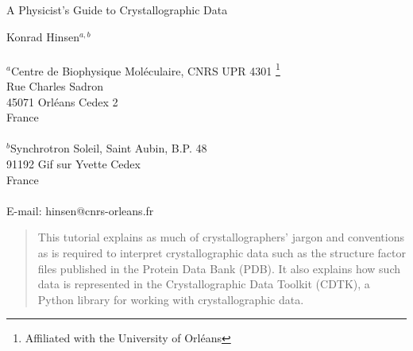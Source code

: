 \documentclass[11pt]{article}
\begin{document}
{\parindent=0mm

{\Large
A Physicist's Guide to Crystallographic Data
}

\vspace{5mm}

{\large Konrad Hinsen$^{a, b}$}\\
\\
$^a$Centre de Biophysique Mol\'eculaire, CNRS UPR 4301
\footnote{Affiliated with the University of Orl\'eans}\\
Rue Charles Sadron\\
45071 Orl\'eans Cedex 2\\
France\\
\\
$^b$Synchrotron Soleil, Saint Aubin, B.P. 48\\
91192 Gif sur Yvette Cedex\\
France\\
\\
E-mail: hinsen@cnrs-orleans.fr\\
}
\date{}

\vspace{15mm}

\begin{abstract}
  This tutorial explains as much of crystallographers' jargon and
  conventions as is required to interpret crystallographic data
  such as the structure factor files published in the Protein
  Data Bank (PDB). It also explains how such data is represented
  in the Crystallographic Data Toolkit (CDTK), a Python library for
  working with crystallographic data.
\end{abstract}
\end{document}
